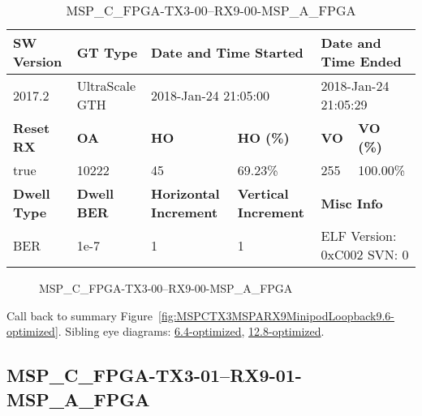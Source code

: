 \begin{table}[h]
\centering
\caption{MSP\_C\_FPGA-TX3-00--RX9-00-MSP\_A\_FPGA}
\label{tab:MSPCFPGATX300RX900MSPAFPGA9.6-optimized}
\begin{tabular}{@{}|l|l|l|l|l|l|@{}}
\toprule
\textbf{SW Version}                & \textbf{GT Type}   & \multicolumn{2}{l|}{\textbf{Date and Time Started}}            & \multicolumn{2}{l|}{\textbf{Date and Time Ended}}        \\ \midrule
2017.2                       & UltraScale GTH          & \multicolumn{2}{l|}{2018-Jan-24 21:05:00}                   & \multicolumn{2}{l|}{2018-Jan-24 21:05:29}               \\ \midrule
\textbf{Reset RX}                  & \textbf{OA} & \textbf{HO}   & \textbf{HO (\%)} & \textbf{VO} & \textbf{VO (\%)} \\ \midrule
true & 10222        & 45          & 69.23\%        & 255        & 100.00\%       \\ \midrule
\textbf{Dwell Type}                & \textbf{Dwell BER} & \textbf{Horizontal Increment} & \textbf{Vertical Increment}    & \multicolumn{2}{l|}{\textbf{Misc Info}}                  \\ \midrule
BER                            & 1e-7        & 1        & 1           & \multicolumn{2}{l|}{ELF Version: 0xC002 SVN: 0}                         \\ \bottomrule
\end{tabular}
\end{table}

\begin{figure}[h]
\caption{MSP\_C\_FPGA-TX3-00--RX9-00-MSP\_A\_FPGA} \label{fig:MSPCFPGATX300RX900MSPAFPGA9.6-optimized}
\end{figure}

Call back to summary Figure~\ref{fig:MSPCTX3MSPARX9MinipodLoopback9.6-optimized}.
Sibling eye diagrams: \hyperref[sec:MSPCFPGATX300RX900MSPAFPGA6.4-optimized]{6.4-optimized}, \hyperref[sec:MSPCFPGATX300RX900MSPAFPGA12.8-optimized]{12.8-optimized}.

\clearpage
\newpage


\subsection{MSP\_C\_FPGA-TX3-01--RX9-01-MSP\_A\_FPGA}\label{sec:MSPCFPGATX301RX901MSPAFPGA9.6-optimized}

